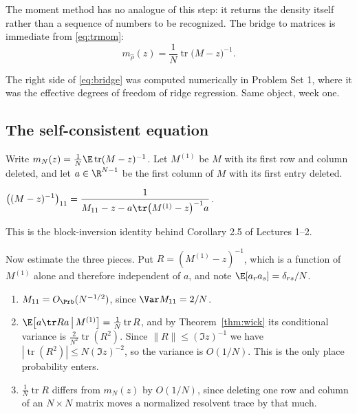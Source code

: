 \documentclass[11pt]{article}
\providecommand{\Tr}{\operatorname{tr}}
\begin{document}
The moment method has no analogue of this step: it returns the density itself rather than a sequence of numbers to be recognized. The bridge to matrices is immediate from \eqref{eq:trmom}:
\begin{equation}\label{eq:bridge}
m_{\hat\rho}(z)=\frac1N\Tr\big(M-z\big)^{-1}.
\end{equation}

\begin{remark}
The right side of \eqref{eq:bridge} was computed numerically in Problem Set 1, where it was the effective degrees of freedom of ridge regression. Same object, week one.
\end{remark}

\subsection{The self-consistent equation}

Write $m_N(z)=\frac1N\E\Tr(M-z)^{-1}$. Let $M^{(1)}$ be $M$ with its first row and column deleted, and let $a\in\R^{N-1}$ be the first column of $M$ with its first entry deleted.

\begin{lemma}\label{lem:schur}
$\displaystyle \big((M-z)^{-1}\big)_{11}=\frac{1}{M_{11}-z-a\tr\big(M^{(1)}-z\big)^{-1}a}$.
\end{lemma}

This is the block-inversion identity behind Corollary 2.5 of Lectures 1--2.

Now estimate the three pieces. Put $R=(M^{(1)}-z)^{-1}$, which is a function of $M^{(1)}$ alone and therefore independent of $a$, and note $\E[a_ra_s]=\delta_{rs}/N$.

\begin{enumerate}[label=(\alph*),leftmargin=1.9em,itemsep=0.15em]
\item $M_{11}=O_{\Prb}(N^{-1/2})$, since $\Var M_{11}=2/N$.
\item $\E\big[a\tr Ra\,\big|\,M^{(1)}\big]=\frac1N\Tr R$, and by Theorem~\ref{thm:wick} its conditional variance is $\frac{2}{N^2}\Tr(R^2)$. Since $\|R\|\le(\Im z)^{-1}$ we have $|\Tr(R^2)|\le N(\Im z)^{-2}$, so the variance is $O(1/N)$. This is the only place probability enters.
\item $\frac1N\Tr R$ differs from $m_N(z)$ by $O(1/N)$, since deleting one row and column of an $N\times N$ matrix moves a normalized resolvent trace by that much.
\end{enumerate}
\end{document}
